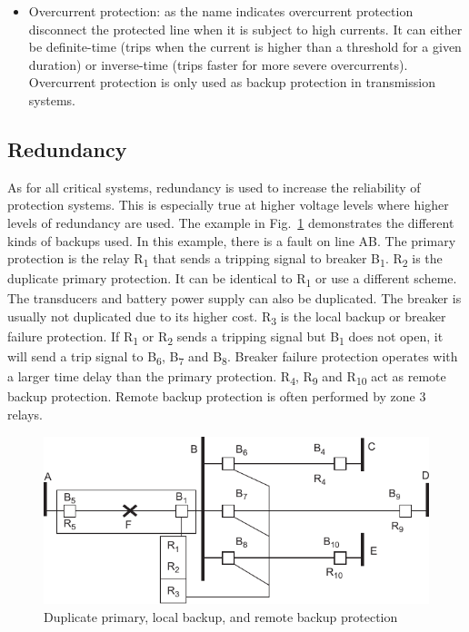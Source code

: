 \begin{itemize}
    \item Overcurrent protection: as the name indicates overcurrent protection disconnect the protected line when it is subject to high currents. It can either be definite-time (trips when the current is higher than a threshold for a given duration) or inverse-time (trips faster for more severe overcurrents). Overcurrent protection is only used as backup protection in transmission systems.
\end{itemize}

\subsection{Redundancy}

As for all critical systems, redundancy is used to increase the reliability of protection systems. This is especially true at higher voltage levels where higher levels of redundancy are used. The example in Fig.~\ref{fig:protectionBackup} demonstrates the different kinds of backups used. In this example, there is a fault on line AB. The primary protection is the relay R\textsubscript{1} that sends a tripping signal to breaker B\textsubscript{1}. R\textsubscript{2} is the duplicate primary protection. It can be identical to R\textsubscript{1} or use a different scheme. The transducers and battery power supply can also be duplicated. The breaker is usually not duplicated due to its higher cost. R\textsubscript{3} is the local backup or breaker failure protection. If R\textsubscript{1} or R\textsubscript{2} sends a tripping signal but B\textsubscript{1} does not open, it will send a trip signal to B\textsubscript{6}, B\textsubscript{7} and B\textsubscript{8}. Breaker failure protection operates with a larger time delay than the primary protection. R\textsubscript{4}, R\textsubscript{9} and R\textsubscript{10} act as remote backup protection. Remote backup protection is often performed by zone 3 relays.

\begin{figure}
    \centering
    \includegraphics[width=0.8\linewidth]{Figs/ProtectionBackup.pdf}
    \caption{Duplicate primary, local backup, and remote backup protection~\cite{HorowitzBook}}
    \label{fig:protectionBackup}
\end{figure}

